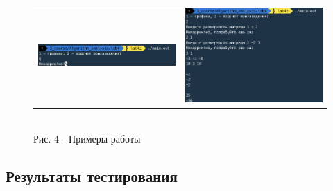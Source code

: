 \documentclass[a4paper,14pt]{article} %
\begin{document}
\begin{figure}[ht]
\begin{tabular}{cc}
			\includegraphics[width=80mm]{ex5} & \includegraphics[width=80mm]{ex6}
		\end{tabular}
		\\ Рис. 4 - Примеры работы
	\end{figure}
	        
        \subsection{Результаты тестирования}
        
\end{document}
